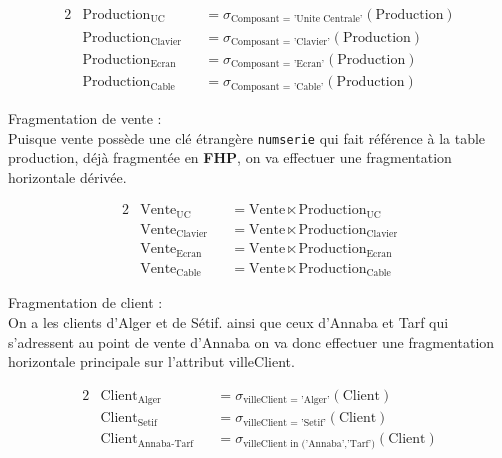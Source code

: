 \documentclass{article}
\begin{document}
\begin{alignat*}{2}
    &\text{Production}_{\text{UC}} &&= \sigma_{\text{Composant = 'Unite Centrale'}} (\text{Production})\\[0.1cm]
    &\text{Production}_{\text{Clavier}} &&= \sigma_{\text{Composant = 'Clavier'}} (\text{Production})\\[0.1cm]
    &\text{Production}_{\text{Ecran}} &&= \sigma_{\text{Composant = 'Ecran'}} (\text{Production})\\[0.1cm]
    &\text{Production}_{\text{Cable}} &&= \sigma_{\text{Composant = 'Cable'}} (\text{Production})
\end{alignat*}

\vspace{0.25cm}

Fragmentation de vente :\\[0.1cm]
Puisque vente possède une clé étrangère \texttt{numserie} qui fait référence à la table production, déjà fragmentée en
\textbf{FHP}, on va effectuer une fragmentation horizontale dérivée.

\begin{alignat*}{2}
    &\text{Vente}_{\text{UC}} &&= \text{Vente} \ltimes \text{Production}_{\text{UC}}\\[0.1cm]
    &\text{Vente}_{\text{Clavier}} &&= \text{Vente} \ltimes \text{Production}_{\text{Clavier}}\\[0.1cm]
    &\text{Vente}_{\text{Ecran}} &&= \text{Vente} \ltimes \text{Production}_{\text{Ecran}}\\[0.1cm]
    &\text{Vente}_{\text{Cable}} &&= \text{Vente} \ltimes \text{Production}_{\text{Cable}}
\end{alignat*}


\vspace{0.25cm}

Fragmentation de client :\\[0.1cm]
On a les clients d’Alger et de Sétif. ainsi que ceux d’Annaba et Tarf qui s’adressent au point de vente d’Annaba 
on va donc effectuer une fragmentation horizontale principale sur l’attribut villeClient.

\begin{alignat*}{2}
    &\text{Client}_{\text{Alger}} &&= \sigma_{\text{villeClient = 'Alger'}} (\text{Client})\\[0.1cm]
    &\text{Client}_{\text{Setif}} &&= \sigma_{\text{villeClient = 'Setif'}} (\text{Client})\\[0.1cm]
    &\text{Client}_{\text{Annaba-Tarf}} &&= \sigma_{\text{villeClient in ('Annaba','Tarf')}} (\text{Client})
\end{alignat*}
\end{document}
